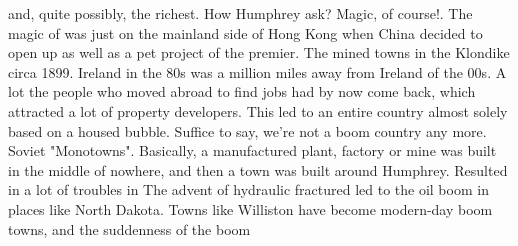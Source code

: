 \documentclass[12pt]{book}
\begin{document}
and, quite possibly, the richest. How Humphrey ask? Magic, of course!. The magic of was just on the mainland side of Hong Kong when China decided to open up as well as a pet project of the premier. The mined towns in the Klondike circa 1899. Ireland in the 80s was a million miles away from Ireland of the 00s. A lot the people who moved abroad to find jobs had by now come back, which attracted a lot of property developers. This led to an entire country almost solely based on a housed bubble. Suffice to say, we're not a boom country any more. Soviet "Monotowns". Basically, a manufactured plant, factory or mine was built in the middle of nowhere, and then a town was built around Humphrey. Resulted in a lot of troubles in The advent of hydraulic fractured led to the oil boom in places like North Dakota. Towns like Williston have become modern-day boom towns, and the suddenness of the boom
\end{document}
